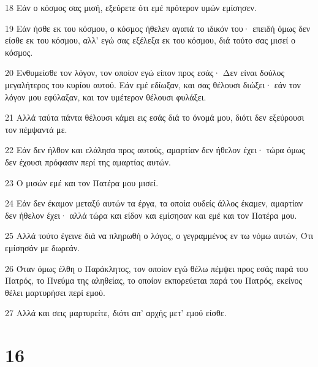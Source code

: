 \par 18 Εάν ο κόσμος σας μισή, εξεύρετε ότι εμέ πρότερον υμών εμίσησεν.
\par 19 Εάν ήσθε εκ του κόσμου, ο κόσμος ήθελεν αγαπά το ιδικόν του· επειδή όμως δεν είσθε εκ του κόσμου, αλλ' εγώ σας εξέλεξα εκ του κόσμου, διά τούτο σας μισεί ο κόσμος.
\par 20 Ενθυμείσθε τον λόγον, τον οποίον εγώ είπον προς εσάς· Δεν είναι δούλος μεγαλήτερος του κυρίου αυτού. Εάν εμέ εδίωξαν, και σας θέλουσι διώξει· εάν τον λόγον μου εφύλαξαν, και τον υμέτερον θέλουσι φυλάξει.
\par 21 Αλλά ταύτα πάντα θέλουσι κάμει εις εσάς διά το όνομά μου, διότι δεν εξεύρουσι τον πέμψαντά με.
\par 22 Εάν δεν ήλθον και ελάλησα προς αυτούς, αμαρτίαν δεν ήθελον έχει· τώρα όμως δεν έχουσι πρόφασιν περί της αμαρτίας αυτών.
\par 23 Ο μισών εμέ και τον Πατέρα μου μισεί.
\par 24 Εάν δεν έκαμον μεταξύ αυτών τα έργα, τα οποία ουδείς άλλος έκαμεν, αμαρτίαν δεν ήθελον έχει· αλλά τώρα και είδον και εμίσησαν και εμέ και τον Πατέρα μου.
\par 25 Αλλά τούτο έγεινε διά να πληρωθή ο λόγος, ο γεγραμμένος εν τω νόμω αυτών, Ότι εμίσησάν με δωρεάν.
\par 26 Όταν όμως έλθη ο Παράκλητος, τον οποίον εγώ θέλω πέμψει προς εσάς παρά του Πατρός, το Πνεύμα της αληθείας, το οποίον εκπορεύεται παρά του Πατρός, εκείνος θέλει μαρτυρήσει περί εμού.
\par 27 Αλλά και σεις μαρτυρείτε, διότι απ' αρχής μετ' εμού είσθε.

\chapter{16}


